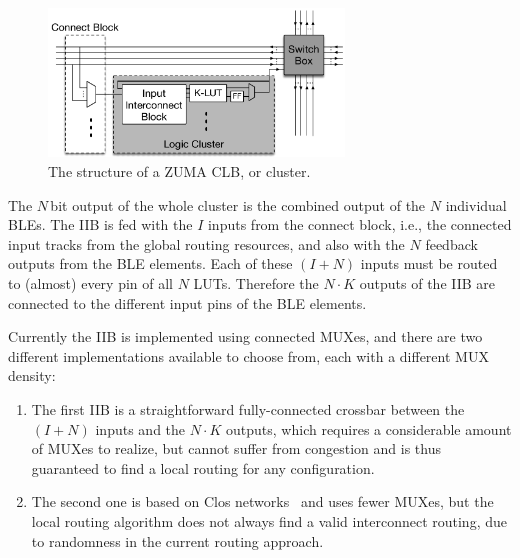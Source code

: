 \documentclass{article}
\begin{document}
\begin{figure}[htbp]
    \centering
    \includegraphics[width=0.7\textwidth]{Figures/ZUMA_CLB}
    \caption{The structure of a ZUMA CLB, or cluster.}
    \label{fig:cluster}
\end{figure}

The \(N\)\,bit output of the whole cluster is the combined output of the \(N\) individual BLEs.
The IIB is fed with the \(I\) inputs from the connect block, i.e., the connected input tracks from the global routing resources, and also with the \(N\) feedback outputs from the BLE elements.
Each of these \({(I+N)}\) inputs must be routed to (almost) every pin of all \(N\) LUTs.
Therefore the \({N \cdot K}\) outputs of the IIB are connected to the different input pins of the BLE elements.

\newpage
Currently the IIB is implemented using connected MUXes, and there are two different implementations available to choose from, each with a different MUX density:
\begin{enumerate}
    \item The first IIB is a straightforward fully-connected crossbar between the \({(I+N)}\) inputs and the \({N \cdot K}\) outputs, which requires a considerable amount of MUXes to realize, but cannot suffer from congestion and is thus guaranteed to find a local routing for any configuration.
    \item The second one is based on Clos networks~\cite{Clos1953Studynonblocking} and uses fewer MUXes,
    but the local routing algorithm does not always find a valid interconnect routing, due to randomness in the current routing approach.
\end{enumerate}
\end{document}
